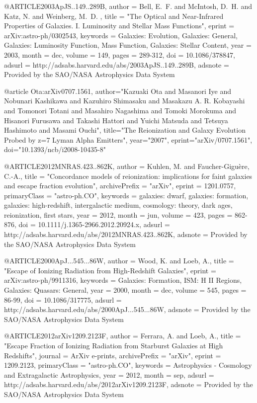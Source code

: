 \documentclass{article}
\begin{document}
@ARTICLE{2003ApJS..149..289B,
   author = {{Bell}, E.~F. and {McIntosh}, D.~H. and {Katz}, N. and {Weinberg}, M.~D.
	},
    title = "{The Optical and Near-Infrared Properties of Galaxies. I. Luminosity and Stellar Mass Functions}",
   eprint = {arXiv:astro-ph/0302543},
 keywords = {Galaxies: Evolution, Galaxies: General, Galaxies: Luminosity Function, Mass Function, Galaxies: Stellar Content},
     year = 2003,
    month = dec,
   volume = 149,
    pages = {289-312},
      doi = {10.1086/378847},
   adsurl = {http://adsabs.harvard.edu/abs/2003ApJS..149..289B},
  adsnote = {Provided by the SAO/NASA Astrophysics Data System}
}

@article {Ota:arXiv0707.1561,
author="Kazuaki Ota and Masanori Iye and Nobunari Kashikawa and Kazuhiro Shimasaku and Masakazu A. R. Kobayashi and Tomonori Totani and Masahiro Nagashima and Tomoki Morokuma and Hisanori Furusawa and Takashi Hattori and Yuichi Matsuda and Tetsuya Hashimoto and Masami Ouchi",
title="The Reionization and Galaxy Evolution Probed by z=7 Lyman Alpha Emitters",
year="2007",
eprint="arXiv/0707.1561",
doi="10.1393/ncb/i2008-10435-8"
} 

@ARTICLE{2012MNRAS.423..862K,
   author = {{Kuhlen}, M. and {Faucher-Gigu{\`e}re}, C.-A.},
    title = "{Concordance models of reionization: implications for faint galaxies and escape fraction evolution}",
archivePrefix = "arXiv",
   eprint = {1201.0757},
 primaryClass = "astro-ph.CO",
 keywords = {galaxies: dwarf, galaxies: formation, galaxies: high-redshift, intergalactic medium, cosmology: theory, dark ages, reionization, first stars},
     year = 2012,
    month = jun,
   volume = 423,
    pages = {862-876},
      doi = {10.1111/j.1365-2966.2012.20924.x},
   adsurl = {http://adsabs.harvard.edu/abs/2012MNRAS.423..862K},
  adsnote = {Provided by the SAO/NASA Astrophysics Data System}
}

@ARTICLE{2000ApJ...545...86W,
   author = {{Wood}, K. and {Loeb}, A.},
    title = "{Escape of Ionizing Radiation from High-Redshift Galaxies}",
   eprint = {arXiv:astro-ph/9911316},
 keywords = {Galaxies: Formation, ISM: H II Regions, Galaxies: Quasars: General},
     year = 2000,
    month = dec,
   volume = 545,
    pages = {86-99},
      doi = {10.1086/317775},
   adsurl = {http://adsabs.harvard.edu/abs/2000ApJ...545...86W},
  adsnote = {Provided by the SAO/NASA Astrophysics Data System}
}

@ARTICLE{2012arXiv1209.2123F,
   author = {{Ferrara}, A. and {Loeb}, A.},
    title = "{Escape Fraction of Ionizing Radiation from Starburst Galaxies at High Redshifts}",
  journal = {ArXiv e-prints},
archivePrefix = "arXiv",
   eprint = {1209.2123},
 primaryClass = "astro-ph.CO",
 keywords = {Astrophysics - Cosmology and Extragalactic Astrophysics},
     year = 2012,
    month = sep,
   adsurl = {http://adsabs.harvard.edu/abs/2012arXiv1209.2123F},
  adsnote = {Provided by the SAO/NASA Astrophysics Data System}
}
\end{document}
